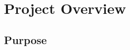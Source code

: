 \documentclass[draftclsnofoot, onecolumn, compsoc, 10pt]{IEEEtran}
\begin{document}
\section{Project Overview}
\subsection{Purpose}



\end{document}
